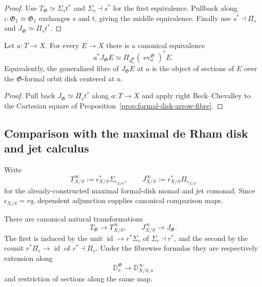 \begin{proof}
Use
$T_{\mathfrak G}\simeq\Sigma_s t^*$ and
$\Sigma_s\dashv s^*$ for the first equivalence.  Pullback along
$\iota:\mathfrak G_1\simeq\mathfrak G_1$ exchanges $s$ and $t$, giving the
middle equivalence.  Finally use $s^*\dashv\Pi_s$ and
$J_{\mathfrak G}\simeq\Pi_s t^*$.
\end{proof}

\begin{proposition}
\label{prop:formal-groupoid-fibrewise-jets}
Let $a:T\to X$.  For every $E\to X$ there is a canonical equivalence
\[
    a^*J_{\mathfrak G}E
    \simeq
    \Pi_{d^{\mathfrak G}_a}
    \left(
        \operatorname{ev}^{\mathfrak G}_a
    \right)^*E.
\]
Equivalently, the generalized fibre of $J_{\mathfrak G}E$ at $a$ is the object
of sections of $E$ over the $\mathfrak G$-formal orbit disk centered at $a$.
\end{proposition}

\begin{proof}
Pull back
$J_{\mathfrak G}\simeq\Pi_s t^*$ along $a:T\to X$ and apply right
Beck--Chevalley to the Cartesian square of
Proposition~\ref{prop:formal-disk-arrow-fibre}.
\end{proof}

\subsection{Comparison with the maximal de Rham disk and jet calculus}

Write
\[
    T^\infty_{X/S}
    :=
    \epsilon_{X/S}^*\Sigma_{\epsilon_{X/S}},
    \qquad
    J^\infty_{X/S}
    :=
    \epsilon_{X/S}^*\Pi_{\epsilon_{X/S}}
\]
for the already-constructed maximal formal-disk monad and jet comonad.  Since
$\epsilon_{X/S}=rq$, dependent adjunction supplies canonical comparison maps.

\begin{proposition}
\label{prop:formal-groupoid-ambient-monad-comonad}
There are canonical natural transformations
\[
    T_{\mathfrak G}
    \longrightarrow
    T^\infty_{X/S},
    \qquad
    J^\infty_{X/S}
    \longrightarrow
    J_{\mathfrak G}.
\]
The first is induced by the unit
$\operatorname{id}\to r^*\Sigma_r$ of
$\Sigma_r\dashv r^*$, and the second by the counit
$r^*\Pi_r\to\operatorname{id}$ of $r^*\dashv\Pi_r$.
Under the fibrewise formulas they are respectively extension along
\[
    \mathbb D^{\mathfrak G}_a
    \longrightarrow
    \mathbb D^\infty_{X/S,a}
\]
and restriction of sections along the same map.
\end{proposition}

